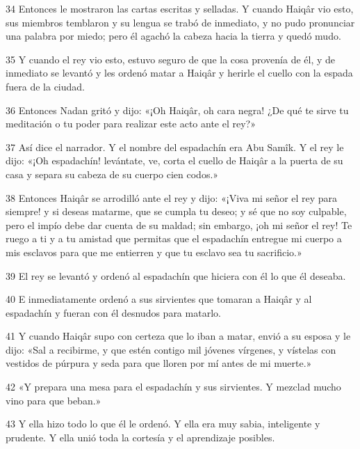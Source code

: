 \par 34 Entonces le mostraron las cartas escritas y selladas. Y cuando Haiqâr vio esto, sus miembros temblaron y su lengua se trabó de inmediato, y no pudo pronunciar una palabra por miedo; pero él agachó la cabeza hacia la tierra y quedó mudo.

\par 35 Y cuando el rey vio esto, estuvo seguro de que la cosa provenía de él, y de inmediato se levantó y les ordenó matar a Haiqâr y herirle el cuello con la espada fuera de la ciudad.

\par 36 Entonces Nadan gritó y dijo: «¡Oh Haiqâr, oh cara negra! ¿De qué te sirve tu meditación o tu poder para realizar este acto ante el rey?»

\par 37 Así dice el narrador. Y el nombre del espadachín era Abu Samîk. Y el rey le dijo: «¡Oh espadachín! levántate, ve, corta el cuello de Haiqâr a la puerta de su casa y separa su cabeza de su cuerpo cien codos.»

\par 38 Entonces Haiqâr se arrodilló ante el rey y dijo: «¡Viva mi señor el rey para siempre! y si deseas matarme, que se cumpla tu deseo; y sé que no soy culpable, pero el impío debe dar cuenta de su maldad; sin embargo, ¡oh mi señor el rey! Te ruego a ti y a tu amistad que permitas que el espadachín entregue mi cuerpo a mis esclavos para que me entierren y que tu esclavo sea tu sacrificio.»

\par 39 El rey se levantó y ordenó al espadachín que hiciera con él lo que él deseaba.

\par 40 E inmediatamente ordenó a sus sirvientes que tomaran a Haiqâr y al espadachín y fueran con él desnudos para matarlo.

\par 41 Y cuando Haiqâr supo con certeza que lo iban a matar, envió a su esposa y le dijo: «Sal a recibirme, y que estén contigo mil jóvenes vírgenes, y vístelas con vestidos de púrpura y seda para que lloren por mí antes de mi muerte.»

\par 42 «Y prepara una mesa para el espadachín y sus sirvientes. Y mezclad mucho vino para que beban.»

\par 43 Y ella hizo todo lo que él le ordenó. Y ella era muy sabia, inteligente y prudente. Y ella unió toda la cortesía y el aprendizaje posibles.

